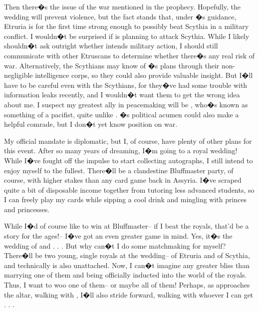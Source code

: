 \documentclass[char]{Kos}
\begin{document}
Then there�s the issue of the war mentioned in the prophecy. Hopefully, the wedding will prevent violence, but the fact stands that, under \cEtruriaKing{\nickname}�s guidance, Etruria is for the first time strong enough to possibly beat Scythia in a military conflict. I wouldn�t be surprised if \cEtruriaKing{\nickname} is planning to attack Scythia. While I likely shouldn�t ask \cEtruriaKing{\them} outright whether \cEtruriaKing{\they} intends military action, I should still communicate with other Etruscans to determine whether there�s any real risk of war. Alternatively, the Scythians may know of \cEtruriaKing{\nickname}�s plans through their non-negligible intelligence corps, so they could also provide valuable insight. But I�ll have to be careful even with the Scythians, for they�ve had some trouble with information leaks recently, and I wouldn�t want them to get the wrong idea about me. I suspect my greatest ally in peacemaking will be \cGroom{\Prince} \cGroom{\nickname}, who�s known as something of a pacifist, quite unlike \cGroom{\their} \cEtruriaKing{\parent}. \cBride{\nickname}�s political acumen could also make \cBride{\them} a helpful comrade, but I don�t yet know \cBride{\their} position on war.

My official mandate is diplomatic, but I, of course, have plenty of other plans for this event. After so many years of dreaming, I�m going to a royal wedding! While I�ve fought off the impulse to start collecting autographs, I still intend to enjoy myself to the fullest. There�ll be a clandestine Bluffmaster party, of course, with higher stakes than any card game back in Assyria. I�ve scraped quite a bit of disposable income together from tutoring less advanced students, so I can freely play my cards while sipping a cool drink and mingling with princes and princesses.

While I�d of course like to win at Bluffmaster-- if I beat the royals, that'd be a story for the ages!-- I�ve got an even greater game in mind. Yes, it�s the wedding of \cBride{\nickname} and \cGroom{\nickname} . . . But why can�t I do some matchmaking for myself? There�ll be two young, single royals at the wedding-- \cPoet{\nickname} of Etruria and \cWard{\nickname} of Scythia, and technically \cEtruriaKing{\nickname} is also unattached. Now, I can�t imagine any greater bliss than marrying one of them and being officially inducted into the world of the royals. Thus, I want to woo one of them-- or maybe all of them! Perhaps, as \cBride{\nickname} approaches the altar, walking with \cGroom{\nickname}, I�ll also stride forward, walking with whoever I can get . . .
\end{document}
